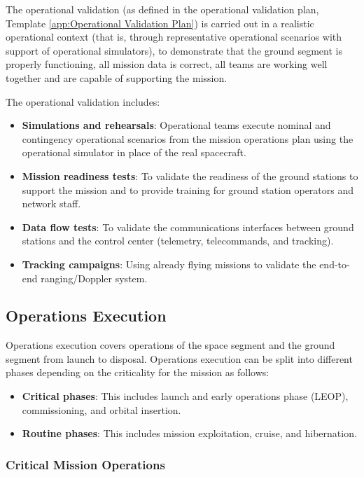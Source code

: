 The operational validation (as defined in the operational validation plan, Template \ref{app:Operational Validation Plan}) is carried out in a realistic operational context (that is, through representative operational scenarios with support of operational simulators), to demonstrate that the ground segment is properly functioning, all mission data is correct, all teams are working well together and are capable of supporting the mission.

The operational validation includes:

\begin{itemize}
\item \textbf{Simulations and rehearsals}: Operational teams execute nominal and contingency operational scenarios from the mission operations plan using the operational simulator in place of the real spacecraft.
\item \textbf{Mission readiness tests}: To validate the readiness of the ground stations to support the mission and to provide training for ground station operators and network staff.
\item \textbf{Data flow tests}: To validate the communications interfaces between ground stations and the control center (telemetry, telecommands, and tracking).
\item \textbf{Tracking campaigns}: Using already flying missions to validate the end-to-end ranging/Doppler system.
\end{itemize}

\subsection{Operations Execution}

Operations execution covers operations of the space segment and the ground segment from launch to disposal. Operations execution can be split into different phases depending on the criticality for the mission as follows:

\begin{itemize}
\item \textbf{Critical phases}: This includes launch and early operations phase (LEOP), commissioning, and orbital insertion.
\item \textbf{Routine phases}: This includes mission exploitation, cruise, and hibernation.
\end{itemize}

\subsubsection{Critical Mission Operations}

